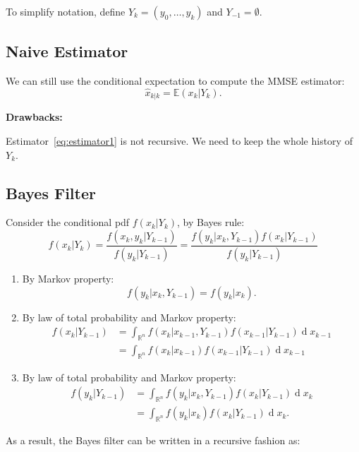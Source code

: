 \documentclass{article}
\DeclareMathOperator{\der}{d}
\begin{document}
To simplify notation, define $Y_k = (y_0,\dots,y_k)$ and $Y_{-1} = \emptyset$.

\subsection{Naive Estimator}
We can still use the conditional expectation to compute the MMSE estimator:
\begin{equation}
  \hat x_{k|k} = \mathbb E(x_k|Y_k).
  \label{eq:estimator1}
\end{equation}

{\bf Drawbacks:}

Estimator~\eqref{eq:estimator1} is not recursive. We need to keep the whole history of $Y_k$. 

\subsection{Bayes Filter}
Consider the conditional pdf $f(x_k|Y_k)$, by Bayes rule:
\begin{displaymath}
  f(x_k|Y_k) = \frac{f(x_k,y_k|Y_{k-1})}{f(y_k|Y_{k-1})} = \frac{f(y_k|x_k,Y_{k-1})f(x_k|Y_{k-1})}{f(y_k|Y_{k-1})} 
\end{displaymath}
\begin{enumerate}
  \item By Markov property:
    \begin{displaymath}
      f(y_k|x_k,Y_{k-1}) = f(y_k|x_k).
    \end{displaymath}
  \item By law of total probability and Markov property:
    \begin{align}
      f(x_k|Y_{k-1}) &= \int_{\mathbb R^n} f(x_k|x_{k-1}, Y_{k-1})f(x_{k-1}|Y_{k-1})\der x_{k-1}\nonumber\\
      &= \int_{\mathbb R^n} f(x_k|x_{k-1})f(x_{k-1}|Y_{k-1})\der x_{k-1}
      \label{eq:bayespredict}
    \end{align}
  \item By law of total probability and Markov property:
    \begin{align*}
      f(y_k|Y_{k-1}) & = \int_{\mathbb R^n} f(y_k|x_k,Y_{k-1}) f(x_k|Y_{k-1})\der x_k\\
      &= \int_{\mathbb R^n} f(y_k|x_k) f(x_k|Y_{k-1})\der x_k.
    \end{align*}
\end{enumerate}
As a result, the Bayes filter can be written in a recursive fashion as:
\end{document}
